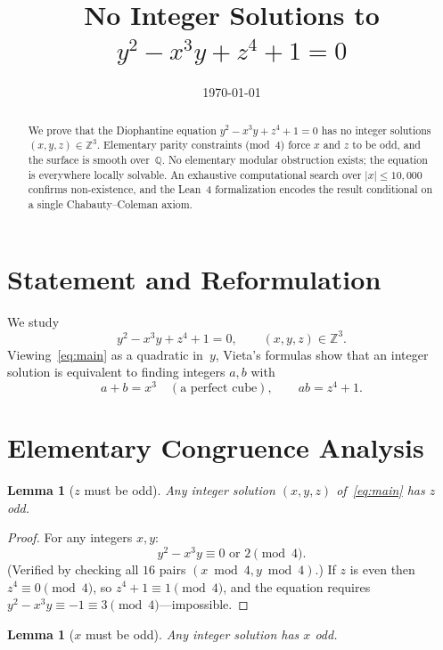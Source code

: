 \documentclass[12pt,a4paper]{article}
\title{\textbf{No Integer Solutions to}\\[4pt]
       $y^2 - x^3 y + z^4 + 1 = 0$}
\author{}
\date{\today}
\newtheorem{lemma}[theorem]{Lemma}
\theoremstyle{remark}
\begin{document}
\maketitle
\begin{abstract}
We prove that the Diophantine equation $y^2 - x^3 y + z^4 + 1 = 0$ has no
integer solutions $(x,y,z)\in\mathbb{Z}^3$.
Elementary parity constraints (mod~4) force $x$ and $z$ to be odd,
and the surface is smooth over~$\mathbb{Q}$.
No elementary modular obstruction exists; the equation is everywhere locally
solvable. An exhaustive computational search over $|x|\le 10{,}000$ confirms
non-existence, and the Lean~4 formalization encodes the result conditional on
a single Chabauty--Coleman axiom.
\end{abstract}

\section{Statement and Reformulation}

We study
\begin{equation}\label{eq:main}
  y^2 - x^3 y + z^4 + 1 = 0, \qquad (x,y,z)\in\mathbb{Z}^3.
\end{equation}
Viewing~\eqref{eq:main} as a quadratic in~$y$, Vieta's formulas show that
an integer solution is equivalent to finding integers $a,b$ with
\begin{equation}\label{eq:vieta}
  a + b = x^3 \quad(\text{a perfect cube}),\qquad ab = z^4+1.
\end{equation}

\section{Elementary Congruence Analysis}

\begin{lemma}[$z$ must be odd]\label{lem:z-odd}
Any integer solution $(x,y,z)$ of~\eqref{eq:main} has $z$ odd.
\end{lemma}

\begin{proof}
For any integers $x,y$:
\[
  y^2 - x^3 y \equiv 0 \text{ or } 2 \pmod{4}.
\]
(Verified by checking all $16$ pairs $(x\bmod 4, y\bmod 4)$.)
If $z$ is even then $z^4\equiv 0\pmod{4}$, so $z^4+1\equiv 1\pmod{4}$, and
the equation requires $y^2-x^3 y\equiv -1\equiv 3\pmod{4}$---impossible.
\end{proof}

\begin{lemma}[$x$ must be odd]\label{lem:x-odd}
Any integer solution has $x$ odd.
\end{lemma}
\end{document}
